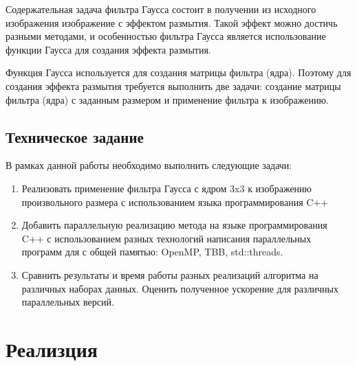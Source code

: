 \documentclass{article}
\begin{document}
\par
Содержательная задача фильтра Гаусса состоит в получении из исходного изображения изображение с эффектом размытия. Такой эффект можно достичь разными методами, и особенностью фильтра Гаусса является использование функции Гаусса для создания эффекта размытия.
\par
Функция Гаусса используется для создания матрицы фильтра (ядра). Поэтому для создания эффекта размытия требуется выполнить две задачи: создание матрицы фильтра (ядра) с заданным размером и применение фильтра к изображению.
\subsection*{Техническое задание}
\par В рамках данной работы необходимо выполнить следующие задачи:
\begin{enumerate}
    \item Реализовать применение фильтра Гаусса с ядром 3x3 к изображению произвольного размера с использованием языка программирования C++
    \item Добавить параллельную реализацию метода на языке программирования C++ с использованием разных технологий написания параллельных программ для с общей памятью: OpenMP, TBB, std::threads.
    \item Сравнить результаты и время работы разных реализаций алгоритма на различных наборах данных. Оценить полученное ускорение для различных параллельных версий.
\end{enumerate}
\newpage

\section*{Реализция}
\end{document}
